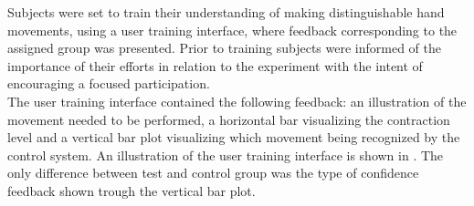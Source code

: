 

Subjects were set to train their understanding of making distinguishable hand movements, using a user training interface, where feedback corresponding to the assigned group was presented. Prior to training subjects were informed of the importance of their efforts in relation to the experiment with the intent of encouraging a focused participation. \\
The user training interface contained the following feedback: an illustration of the movement needed to be performed, a horizontal bar visualizing the contraction level and a vertical bar plot visualizing which movement being recognized by the control system. An illustration of the user training interface is shown in . The only difference between test and control group was the type of confidence feedback shown trough the vertical bar plot. 

